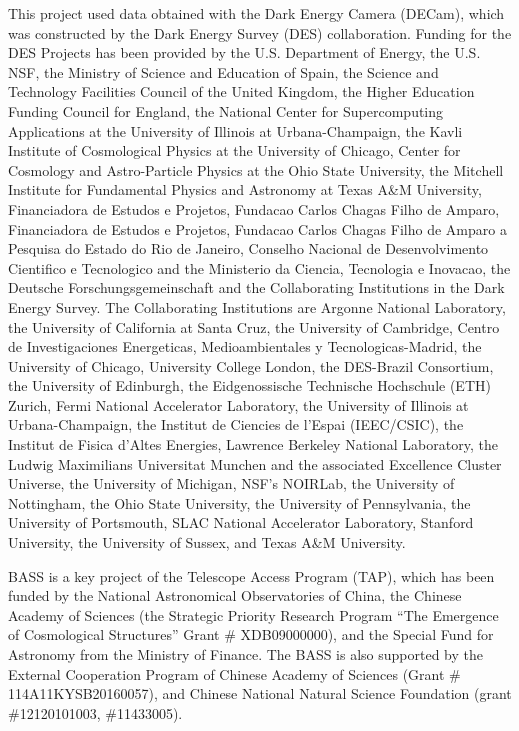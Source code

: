 \documentclass[twocolumn,twocolappendix, linenumbers, trackchanges]{aastex7}
\begin{document}
This project used data obtained with the Dark Energy Camera (DECam), which was constructed by the Dark Energy Survey (DES) collaboration. Funding for the DES Projects has been provided by the U.S. Department of Energy, the U.S. NSF, the Ministry of Science and Education of Spain, the Science and Technology Facilities Council of the United Kingdom, the Higher Education Funding Council for England, the National Center for Supercomputing Applications at the University of Illinois at Urbana-Champaign, the Kavli Institute of Cosmological Physics at the University of Chicago, Center for Cosmology and Astro-Particle Physics at the Ohio State University, the Mitchell Institute for Fundamental Physics and Astronomy at Texas A\&M University, Financiadora de Estudos e Projetos, Fundacao Carlos Chagas Filho de Amparo, Financiadora de Estudos e Projetos, Fundacao Carlos Chagas Filho de Amparo a Pesquisa do Estado do Rio de Janeiro, Conselho Nacional de Desenvolvimento Cientifico e Tecnologico and the Ministerio da Ciencia, Tecnologia e Inovacao, the Deutsche Forschungsgemeinschaft and the Collaborating Institutions in the Dark Energy Survey. The Collaborating Institutions are Argonne National Laboratory, the University of California at Santa Cruz, the University of Cambridge, Centro de Investigaciones Energeticas, Medioambientales y Tecnologicas-Madrid, the University of Chicago, University College London, the DES-Brazil Consortium, the University of Edinburgh, the Eidgenossische Technische Hochschule (ETH) Zurich, Fermi National Accelerator Laboratory, the University of Illinois at Urbana-Champaign, the Institut de Ciencies de l’Espai (IEEC/CSIC), the Institut de Fisica d’Altes Energies, Lawrence Berkeley National Laboratory, the Ludwig Maximilians Universitat Munchen and the associated Excellence Cluster Universe, the University of Michigan, NSF’s NOIRLab, the University of Nottingham, the Ohio State University, the University of Pennsylvania, the University of Portsmouth, SLAC National Accelerator Laboratory, Stanford University, the University of Sussex, and Texas A\&M University.

BASS is a key project of the Telescope Access Program (TAP), which has been funded by the National Astronomical Observatories of China, the Chinese Academy of Sciences (the Strategic Priority Research Program “The Emergence of Cosmological Structures” Grant \# XDB09000000), and the Special Fund for Astronomy from the Ministry of Finance. The BASS is also supported by the External Cooperation Program of Chinese Academy of Sciences (Grant \# 114A11KYSB20160057), and Chinese National Natural Science Foundation (grant \#12120101003, \#11433005).
\end{document}
